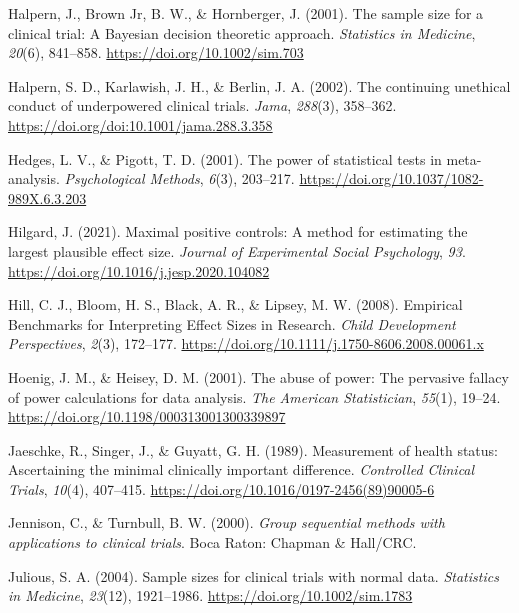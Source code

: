 \documentclass[
  english,
  ,jou, a4paper,floatsintext]{apa6}
\newlength{\cslhangindent}
\newenvironment{cslreferences}%
  {\setlength{\parindent}{0pt}%
  \everypar{\setlength{\hangindent}{\cslhangindent}}\ignorespaces}%
  {\par}
\begin{document}
\begin{cslreferences}
\leavevmode\hypertarget{ref-halpern_sample_2001}{}%
Halpern, J., Brown Jr, B. W., \& Hornberger, J. (2001). The sample size for a clinical trial: A Bayesian decision theoretic approach. \emph{Statistics in Medicine}, \emph{20}(6), 841--858. \url{https://doi.org/10.1002/sim.703}

\leavevmode\hypertarget{ref-halpern_continuing_2002}{}%
Halpern, S. D., Karlawish, J. H., \& Berlin, J. A. (2002). The continuing unethical conduct of underpowered clinical trials. \emph{Jama}, \emph{288}(3), 358--362. \url{https://doi.org/doi:10.1001/jama.288.3.358}

\leavevmode\hypertarget{ref-hedges_power_2001}{}%
Hedges, L. V., \& Pigott, T. D. (2001). The power of statistical tests in meta-analysis. \emph{Psychological Methods}, \emph{6}(3), 203--217. \url{https://doi.org/10.1037/1082-989X.6.3.203}

\leavevmode\hypertarget{ref-hilgard_maximal_2021}{}%
Hilgard, J. (2021). Maximal positive controls: A method for estimating the largest plausible effect size. \emph{Journal of Experimental Social Psychology}, \emph{93}. \url{https://doi.org/10.1016/j.jesp.2020.104082}

\leavevmode\hypertarget{ref-hill_empirical_2008}{}%
Hill, C. J., Bloom, H. S., Black, A. R., \& Lipsey, M. W. (2008). Empirical Benchmarks for Interpreting Effect Sizes in Research. \emph{Child Development Perspectives}, \emph{2}(3), 172--177. \url{https://doi.org/10.1111/j.1750-8606.2008.00061.x}

\leavevmode\hypertarget{ref-hoenig_abuse_2001}{}%
Hoenig, J. M., \& Heisey, D. M. (2001). The abuse of power: The pervasive fallacy of power calculations for data analysis. \emph{The American Statistician}, \emph{55}(1), 19--24. \url{https://doi.org/10.1198/000313001300339897}

\leavevmode\hypertarget{ref-jaeschke_measurement_1989}{}%
Jaeschke, R., Singer, J., \& Guyatt, G. H. (1989). Measurement of health status: Ascertaining the minimal clinically important difference. \emph{Controlled Clinical Trials}, \emph{10}(4), 407--415. \url{https://doi.org/10.1016/0197-2456(89)90005-6}

\leavevmode\hypertarget{ref-jennison_group_2000}{}%
Jennison, C., \& Turnbull, B. W. (2000). \emph{Group sequential methods with applications to clinical trials}. Boca Raton: Chapman \& Hall/CRC.

\leavevmode\hypertarget{ref-julious_sample_2004}{}%
Julious, S. A. (2004). Sample sizes for clinical trials with normal data. \emph{Statistics in Medicine}, \emph{23}(12), 1921--1986. \url{https://doi.org/10.1002/sim.1783}


\end{cslreferences}
\end{document}
